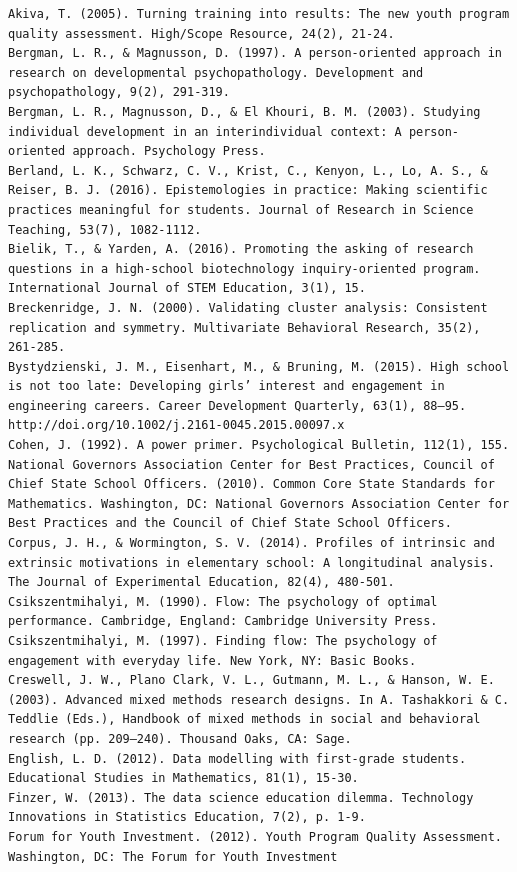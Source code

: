 \documentclass[]{msu-thesis}
\theoremstyle{definition}
\theoremstyle{definition}
\theoremstyle{definition}
\theoremstyle{remark}
\begin{document}
\begin{verbatim}
Akiva, T. (2005). Turning training into results: The new youth program quality assessment. High/Scope Resource, 24(2), 21-24.  
Bergman, L. R., & Magnusson, D. (1997). A person-oriented approach in research on developmental psychopathology. Development and psychopathology, 9(2), 291-319.  
Bergman, L. R., Magnusson, D., & El Khouri, B. M. (2003). Studying individual development in an interindividual context: A person-oriented approach. Psychology Press.  
Berland, L. K., Schwarz, C. V., Krist, C., Kenyon, L., Lo, A. S., & Reiser, B. J. (2016). Epistemologies in practice: Making scientific practices meaningful for students. Journal of Research in Science Teaching, 53(7), 1082-1112.  
Bielik, T., & Yarden, A. (2016). Promoting the asking of research questions in a high-school biotechnology inquiry-oriented program. International Journal of STEM Education, 3(1), 15.  
Breckenridge, J. N. (2000). Validating cluster analysis: Consistent replication and symmetry. Multivariate Behavioral Research, 35(2), 261-285.  
Bystydzienski, J. M., Eisenhart, M., & Bruning, M. (2015). High school is not too late: Developing girls’ interest and engagement in engineering careers. Career Development Quarterly, 63(1), 88–95.   http://doi.org/10.1002/j.2161-0045.2015.00097.x
Cohen, J. (1992). A power primer. Psychological Bulletin, 112(1), 155.  
National Governors Association Center for Best Practices, Council of Chief State School Officers. (2010). Common Core State Standards for Mathematics. Washington, DC: National Governors Association Center for Best Practices and the Council of Chief State School Officers.  
Corpus, J. H., & Wormington, S. V. (2014). Profiles of intrinsic and extrinsic motivations in elementary school: A longitudinal analysis. The Journal of Experimental Education, 82(4), 480-501.  
Csikszentmihalyi, M. (1990). Flow: The psychology of optimal performance. Cambridge, England: Cambridge University Press.  
Csikszentmihalyi, M. (1997). Finding flow: The psychology of engagement with everyday life. New York, NY: Basic Books.  
Creswell, J. W., Plano Clark, V. L., Gutmann, M. L., & Hanson, W. E. (2003). Advanced mixed methods research designs. In A. Tashakkori & C. Teddlie (Eds.), Handbook of mixed methods in social and behavioral research (pp. 209–240). Thousand Oaks, CA: Sage.  
English, L. D. (2012). Data modelling with first-grade students. Educational Studies in Mathematics, 81(1), 15-30.  
Finzer, W. (2013). The data science education dilemma. Technology Innovations in Statistics Education, 7(2), p. 1-9.  
Forum for Youth Investment. (2012). Youth Program Quality Assessment. Washington, DC: The Forum for Youth Investment

\end{verbatim}
\end{document}
